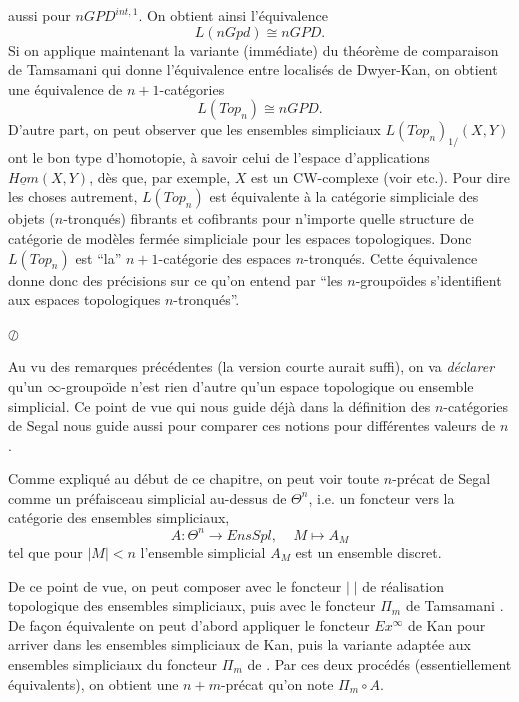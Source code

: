 \documentclass[12pt]{article}
\begin{document}
aussi pour $nGPD^{int, 1}$. On obtient ainsi l'\'equivalence
$$
L(nGpd) \cong nGPD.
$$
Si on applique maintenant la variante (imm\'ediate)
du th\'eor\`eme de comparaison de Tamsamani
qui donne l'\'equivalence entre localis\'es de Dwyer-Kan,
on obtient une \'equivalence de $n+1$-cat\'egories
$$
L(Top_n)\cong nGPD.
$$
D'autre part, on peut observer que les
ensembles simpliciaux
$L(Top _n)_{1/}(X,Y)$ ont le bon type d'homotopie, \`a savoir celui
de l'espace d'applications
$\underline{Hom}(X,Y)$, d\`es que, par exemple, $X$ est un CW-complexe
(voir \cite{DwyerKan3} etc.).
Pour dire
les choses autrement, $L(Top_n)$ est \'equivalente \`a la cat\'egorie
simpliciale
des objets
($n$-tronqu\'es) fibrants et cofibrants pour n'importe quelle structure de
cat\'egorie de mod\`eles ferm\'ee simpliciale pour les espaces
topologiques. Donc
$L(Top_n)$ est ``la'' $n+1$-cat\'egorie des espaces $n$-tronqu\'es. Cette
\'equivalence donne donc des pr\'ecisions sur ce qu'on entend par
``les $n$-groupo\"{\i}des s'identifient aux espaces
topologiques
$n$-tronqu\'es''.

\noindent $\oslash$

\medskip

Au vu des remarques pr\'ec\'edentes (la version courte aurait suffi), on va
{\em d\'eclarer} qu'un $\infty$-groupo\"{\i}de n'est rien d'autre qu'un espace
topologique ou ensemble simplicial. Ce point de vue qui nous guide d\'ej\`a
dans la
d\'efinition des $n$-cat\'egories de Segal nous guide aussi pour
comparer ces notions pour diff\'erentes valeurs de $n$.


Comme expliqu\'e au d\'ebut de ce chapitre, on peut voir toute $n$-pr\'ecat de
Segal comme un pr\'efaisceau simplicial au-dessus de $\Theta ^n$, i.e. un
foncteur vers la cat\'egorie des ensembles simpliciaux,
$$
A:\Theta ^n \rightarrow EnsSpl,\;\;\;\; M\mapsto A_M
$$
tel que pour $|M| < n$ l'ensemble simplicial
$A_M$ est un ensemble discret.

De ce point de vue, on peut
composer avec le foncteur
$| \; |$ de r\'ealisation topologique des ensembles simpliciaux, puis avec
le foncteur $\Pi _m$ de Tamsamani \cite{Tamsamani}. De fa\c{c}on \'equivalente
on peut d'abord appliquer le foncteur
$Ex^{\infty}$ de Kan pour arriver dans les ensembles
simpliciaux de Kan, puis la variante adapt\'ee aux ensembles
simpliciaux du foncteur $\Pi _m$ de \cite{Tamsamani}.  Par ces deux
proc\'ed\'es (essentiellement \'equivalents), on obtient une
$n+m$-pr\'ecat qu'on note  $\Pi _m \circ A$.
\end{document}
